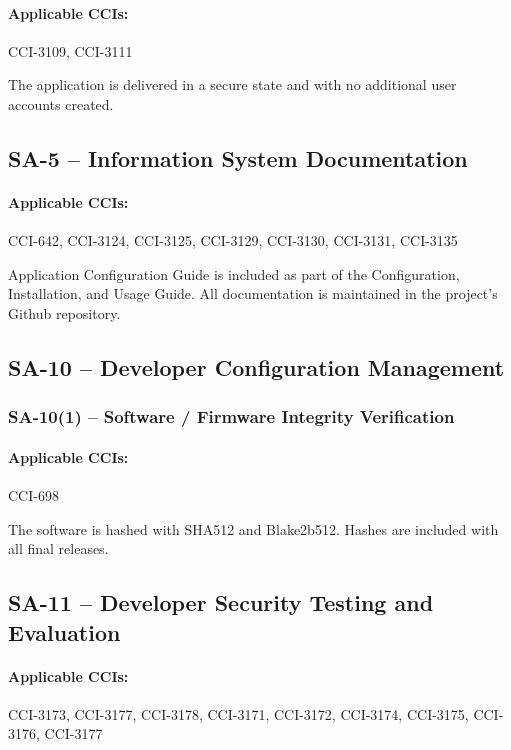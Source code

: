 \documentclass[letterpaper, 10pt, twoside]{article}
\begin{document}
\paragraph{Applicable CCIs:} CCI-3109, CCI-3111

The application is delivered in a secure state and with no additional user accounts created.

\subsection{SA-5 -- Information System Documentation}

\paragraph{Applicable CCIs:} CCI-642, CCI-3124, CCI-3125, CCI-3129, CCI-3130, CCI-3131, CCI-3135

Application Configuration Guide is included as part of the Configuration, Installation, and Usage Guide. All documentation is maintained in the project's Github repository.

\subsection{SA-10 -- Developer Configuration Management}

\subsubsection{SA-10(1) -- Software / Firmware Integrity Verification}

\paragraph{Applicable CCIs:} CCI-698

The software is hashed with SHA512 and Blake2b512. Hashes are included with all final releases.

\subsection{SA-11 -- Developer Security Testing and Evaluation}
\label{sec:sa-11}

\paragraph{Applicable CCIs:} CCI-3173, CCI-3177, CCI-3178, CCI-3171, CCI-3172, CCI-3174, CCI-3175, CCI-3176, CCI-3177
\end{document}
